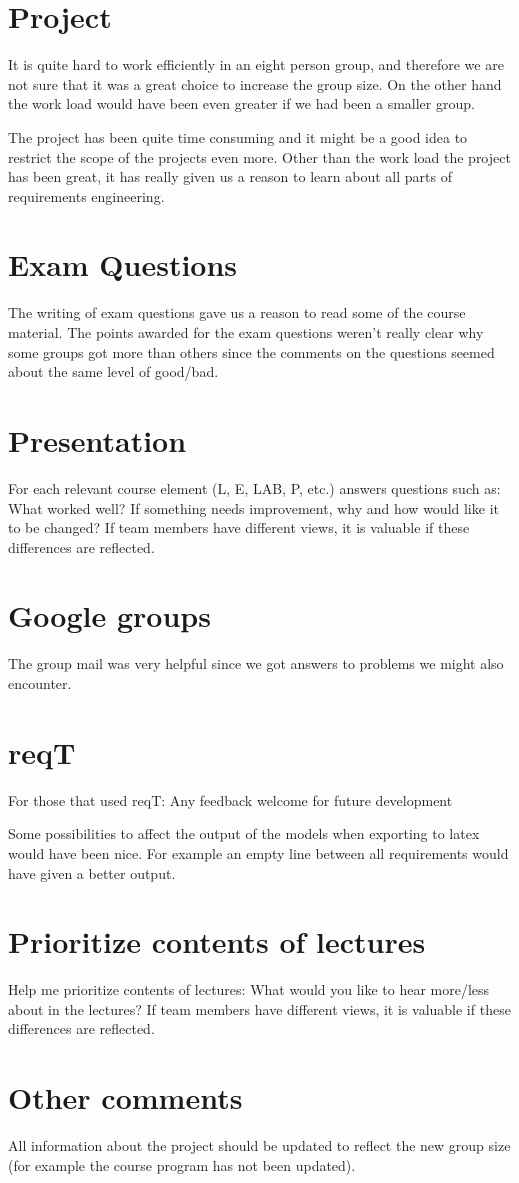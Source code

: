 \documentclass[a4paper]{article}
\begin{document}
	\section{Project}
	It is quite hard to work efficiently in an eight person group, and therefore we are not sure that it was a great choice to increase the group size. On the other hand the work load would have been even greater if we had been a smaller group.
	
	The project has been quite time consuming and it might be a good idea to restrict the scope of the projects even more. Other than the work load the project has been great, it has really given us a reason to learn about all parts of requirements engineering.

	\section{Exam Questions}
	The writing of exam questions gave us a reason to read some of the course material. The points awarded for the exam questions weren't really clear why some groups got more than others since the comments on the questions seemed about the same level of good/bad.	
	
	\section{Presentation}
	For each relevant course element (L, E, LAB, P, etc.) answers questions such as:
What worked well? If something needs improvement, why and how would like
it to be changed?
If team members have different views, it is valuable if these differences are
reflected.

	\section{Google groups}
	The group mail was very helpful since we got answers to problems we might also encounter.

	\section{reqT}
	For those that used reqT: Any feedback welcome for future development
	
	Some possibilities to affect the output of the models when exporting to latex would have been nice. For example an empty line between all requirements would have given a better output.

	\section{Prioritize contents of lectures}
	Help me prioritize contents of lectures:
What would you like to hear more/less about in the lectures?
If team members have different views, it is valuable if these differences are
reflected.

	\section{Other comments}
	All information about the project should be updated to reflect the new group size (for example the course program has not been updated).
\end{document}
